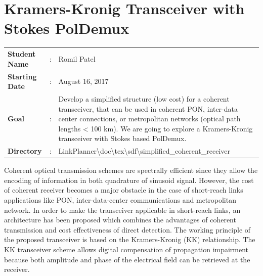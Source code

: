 \clearpage
\section{Kramers-Kronig Transceiver  with Stokes PolDemux}

\begin{tcolorbox}	
\begin{tabular}{p{2.75cm} p{0.2cm} p{10.5cm}} 	
\textbf{Student Name}  &:& Romil Patel\\
\textbf{Starting Date} &:& August 16, 2017\\
\textbf{Goal}          &:& Develop a simplified structure (low cost) for a coherent transceiver, that can be used in coherent PON, inter-data center connections, or metropolitan networks (optical path lengths < 100 km). We are going to explore a Kramers-Kronig transceiver with Stokes based PolDemux.\\
\textbf{Directory} 	   &:&LinkPlanner\textbackslash doc\textbackslash tex\textbackslash sdf\textbackslash simplified\_coherent\_receiver 
\end{tabular}
\end{tcolorbox}

Coherent optical transmission schemes are spectrally efficient since they allow the encoding of information in both quadrature of sinusoid signal. However, the cost of coherent receiver becomes a major obstacle in the case of short-reach links applications like PON, inter-data-center communications and metropolitan network. In order to make the transceiver applicable in short-reach links, an architecture has been proposed which combines the advantages of coherent transmission and cost effectiveness of direct detection. The working principle of the proposed transceiver is based on the Kramers-Kronig (KK) relationship. The KK transceiver scheme allows digital compensation of propagation impairment because both amplitude and phase of the electrical field can be retrieved at the receiver. 
